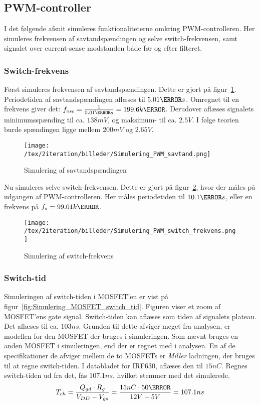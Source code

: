 
\subsection{PWM-controller}
I det følgende afsnit simuleres funktionaliteterne omkring PWM-controlleren. Her simuleres frekvensen af savtandspændingen og selve switch-frekvensen, samt signalet over current-sense modstanden både før og efter filteret.

\subsubsection{Switch-frekvens}
\noindent Først simuleres frekvensen af savtandspændingen. Dette er gjort på figur~\ref{fig:Simulering_PWM_savtand}. Periodetiden af savtandspændingen aflæses til $5.01\micro s$. Omregnet til en frekvens giver det: $f_{osc}=\frac{1}{5.01\micro s}=199.6k\hertz$. Derudover aflæses signalets minimumsspænding til ca. $138mV$, og maksimum- til ca. $2.5V$. I følge teorien burde spændingen ligge mellem $200mV$ og $2.65V$.

\begin{figure}[H]
	\center
	\texttt{[image: /tex/2iteration/billeder/Simulering\_PWM\_savtand.png]}
	\caption{Simulering af savtandspændingen}
	\label{fig:Simulering_PWM_savtand}
\end{figure}

\noindent Nu simuleres selve switch-frekvensen. Dette er gjort på figur~\ref{fig:Simulering_PWM_switch_frekvens}, hvor der måles på udgangen af PWM-controlleren. Her måles periodetiden til $10.1\micro s$, eller en frekvens på $f_s=99.01k\hertz$. 

\begin{figure}[H]
	\center
	\texttt{[image: /tex/2iteration/billeder/Simulering\_PWM\_switch\_frekvens.png]}
	\caption{Simulering af switch-frekvens}
	\label{fig:Simulering_PWM_switch_frekvens}
\end{figure}

\subsubsection{Switch-tid}
\noindent Simuleringen af switch-tiden i MOSFET'en er vist på figur~\ref{fig:Simulering_MOSFET_switch_tid}. Figuren viser et zoom af MOSFET'ens gate signal. Switch-tiden kan aflæses som tiden af signalets plateau. Det aflæses til ca. $103ns$. Grunden til dette afviger meget fra analysen, er modellen for den MOSFET der bruges i simuleringen. Som nævnt bruges en anden MOSFET i simuleringen, end der er regnet med i analysen. En af de specifikationer de afviger mellem de to MOSFETs er \textit{Miller} ladningen, der bruges til at regne switch-tiden. I databladet for IRF630\cite{IRF630}, aflæses den til $15nC$. Regnes switch-tiden ud fra det, fås $107.1ns$, hvilket stemmer med det simulerede. 
\begin{equation} 
T_{ch} = \frac{Q_{gd} \cdot R_{g}}{V_{DD}-V_{gs}} = \frac{15nC \cdot 50\ohm}{12V-5V} = 107.1ns
\end{equation}

